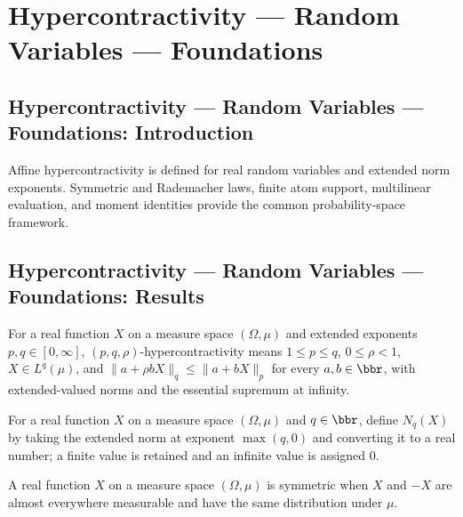 \section{Hypercontractivity --- Random Variables --- Foundations}
\subsection*{Hypercontractivity --- Random Variables --- Foundations: Introduction}
Affine hypercontractivity is defined for real random variables and extended norm exponents. Symmetric and Rademacher laws, finite atom support, multilinear evaluation, and moment identities provide the common probability-space framework.

\subsection*{Hypercontractivity --- Random Variables --- Foundations: Results}

\begin{definition}
\leanok
{}
For a real function $X$ on a measure space $(\Omega,\mu)$ and extended exponents $p,q\in[0,\infty]$, $(p,q,\rho)$-hypercontractivity means $1\le p\le q$, $0\le\rho<1$, $X\in L^q(\mu)$, and $\|a+\rho bX\|_q\le\|a+bX\|_p$ for every $a,b\in\bbr$, with extended-valued norms and the essential supremum at infinity.
\end{definition}

\begin{definition}
\leanok
For a real function $X$ on a measure space $(\Omega,\mu)$ and $q\in\bbr$, define $N_q(X)$ by taking the extended norm at exponent $\max(q,0)$ and converting it to a real number; a finite value is retained and an infinite value is assigned $0$.
\end{definition}

\begin{definition}
\leanok
{}
A real function $X$ on a measure space $(\Omega,\mu)$ is symmetric when $X$ and $-X$ are almost everywhere measurable and have the same distribution under $\mu$.
\end{definition}

